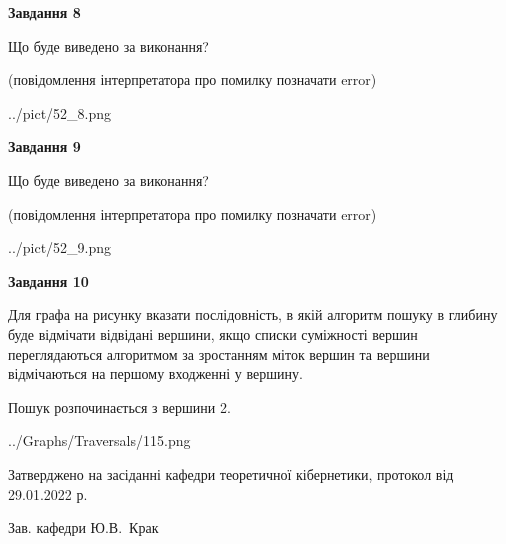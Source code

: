 \documentclass[12pt, ukrainian]{article}
\begin{document}
{\begin {large}
{\begin {center}\textbf{Завдання 8}\end {center}}\par
Що буде виведено за виконання?\par
 (повідомлення інтерпретатора про помилку позначати error)\par
\begin{center}
	{../pict/52_8.png}
\end{center}
\newpage

{\begin {center}\textbf{Завдання 9}\end {center}}\par
Що буде виведено за виконання?\par
 (повідомлення інтерпретатора про помилку позначати error)\par
\begin{center}
	{../pict/52_9.png}
\end{center}
\newpage

{\begin {center}\textbf{Завдання 10}\end {center}}\par
Для графа на рисунку вказати послідовність, в якій алгоритм пошуку в глибину буде відмічати відвідані вершини, якщо списки суміжності вершин переглядаються алгоритмом за зростанням міток вершин та вершини відмічаються на першому вход\-женні у вершину.\par
Пошук розпочинається з вершини 2.\par

\begin{center}
	{../Graphs/Traversals/115.png}
\end{center}\par
\newpage


\end {large}
}
{\smallskip \begin {small} Затверджено на засіданні кафедри теоретичної кібернетики, протокол  від   29.01.2022 р.\par\smallskip\smallskip
{\parbox {6.5 cm}{Зав. кафедри \dotfill Ю.В.~Крак}} \end{small}}
\end{document}

